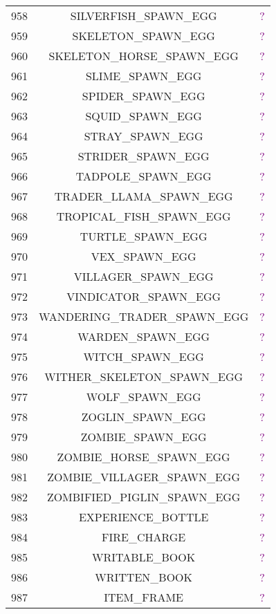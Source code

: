 \documentclass[11pt]{article}
\newcommand\myworries[1]{\textcolor{purple}{#1}}
\begin{document}
\begin{longtable}{ |c|c|c| }
	958 & SILVERFISH\_SPAWN\_EGG & \myworries{?} \\
	959 & SKELETON\_SPAWN\_EGG & \myworries{?} \\
	960 & SKELETON\_HORSE\_SPAWN\_EGG & \myworries{?} \\
	961 & SLIME\_SPAWN\_EGG & \myworries{?} \\
	962 & SPIDER\_SPAWN\_EGG & \myworries{?} \\
	963 & SQUID\_SPAWN\_EGG & \myworries{?} \\
	964 & STRAY\_SPAWN\_EGG & \myworries{?} \\
	965 & STRIDER\_SPAWN\_EGG & \myworries{?} \\
	966 & TADPOLE\_SPAWN\_EGG & \myworries{?} \\
	967 & TRADER\_LLAMA\_SPAWN\_EGG & \myworries{?} \\
	968 & TROPICAL\_FISH\_SPAWN\_EGG & \myworries{?} \\
	969 & TURTLE\_SPAWN\_EGG & \myworries{?} \\
	970 & VEX\_SPAWN\_EGG & \myworries{?} \\
	971 & VILLAGER\_SPAWN\_EGG & \myworries{?} \\
	972 & VINDICATOR\_SPAWN\_EGG & \myworries{?} \\
	973 & WANDERING\_TRADER\_SPAWN\_EGG & \myworries{?} \\
	974 & WARDEN\_SPAWN\_EGG & \myworries{?} \\
	975 & WITCH\_SPAWN\_EGG & \myworries{?} \\
	976 & WITHER\_SKELETON\_SPAWN\_EGG & \myworries{?} \\
	977 & WOLF\_SPAWN\_EGG & \myworries{?} \\
	978 & ZOGLIN\_SPAWN\_EGG & \myworries{?} \\
	979 & ZOMBIE\_SPAWN\_EGG & \myworries{?} \\
	980 & ZOMBIE\_HORSE\_SPAWN\_EGG & \myworries{?} \\
	981 & ZOMBIE\_VILLAGER\_SPAWN\_EGG & \myworries{?} \\
	982 & ZOMBIFIED\_PIGLIN\_SPAWN\_EGG & \myworries{?} \\
	983 & EXPERIENCE\_BOTTLE & \myworries{?} \\
	984 & FIRE\_CHARGE & \myworries{?} \\
	985 & WRITABLE\_BOOK & \myworries{?} \\
	986 & WRITTEN\_BOOK & \myworries{?} \\
	987 & ITEM\_FRAME & \myworries{?} \\

\end{longtable}
\end{document}
